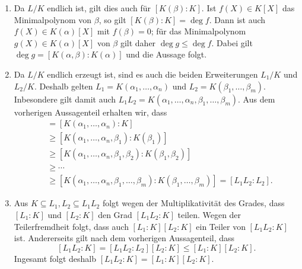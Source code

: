 \begin{solution}
  \begin{enumerate}
    \item
      Da $L/K$ endlich ist, gilt dies auch für $[K(\beta) : K]$.
      Ist $f(X) \in K[X]$ das Minimalpolynom von $\beta$, so gilt $[K(\beta) : K] = \deg f$.
      Dann ist auch $f(X) \in K(\alpha)[X]$ mit $f(\beta) = 0$;
      für das Minimalpolynom $g(X) \in K(\alpha)[X]$ von $\beta$ gilt daher $\deg g \leq \deg f$.
      Dabei gilt $\deg g = [K(\alpha, \beta) : K(\alpha)]$ und die Aussage folgt.
    
    \item
      Da $L/K$ endlich erzeugt ist, sind es auch die beiden Erweiterungen $L_1/K$ und $L_2/K$.
      Deshalb gelten $L_1 = K(\alpha_1, \dotsc, \alpha_n)$ und $L_2 = K(\beta_1, \dotsc, \beta_m)$.
      Inbesondere gilt damit auch $L_1 L_2 = K(\alpha_1, \dotsc, \alpha_n, \beta_1, \dotsc, \beta_m)$.
      Aus dem vorherigen Aussagenteil erhalten wir, dass
      \begin{align*}
              [L_1 : K]
       &=     [K(\alpha_1, \dotsc, \alpha_n) : K]
       \\
       &\geq  [K(\alpha_1, \dotsc, \alpha_n, \beta_1) : K(\beta_1)]
       \\
       &\geq  [K(\alpha_1, \dotsc, \alpha_n, \beta_1, \beta_2) : K(\beta_1, \beta_2)]
       \\
       &\geq  \dotsb
       \\
       &\geq  [K(\alpha_1, \dotsc, \alpha_n, \beta_1, \dotsc, \beta_m) : K(\beta_1, \dotsc, \beta_m)]
        =  [L_1 L_2 : L_2].
      \end{align*}
    
    \item
      Aus $K \subseteq L_1, L_2 \subseteq L_1 L_2$ folgt wegen der Multiplikativität des Grades, dass $[L_1 : K]$ und $[L_2 : K]$ den Grad $[L_1 L_2 : K]$ teilen.
      Wegen der Teilerfremdheit folgt, dass auch $[L_1 : K] [L_2 : K]$ ein Teiler von $[L_1 L_2 : K]$ ist.
      Andererseits gilt nach dem vorherigen Aussagenteil, dass
      \[
              [L_1 L_2 : K]
        =     [L_1 L_2 : L_2] [L_2 : K]
        \leq  [L_1 : K] [L_2 : K].
      \]
      Ingesamt folgt deshalb $[L_1 L_2 : K] = [L_1 : K][L_2 : K]$.
  \end{enumerate}
\end{solution}


